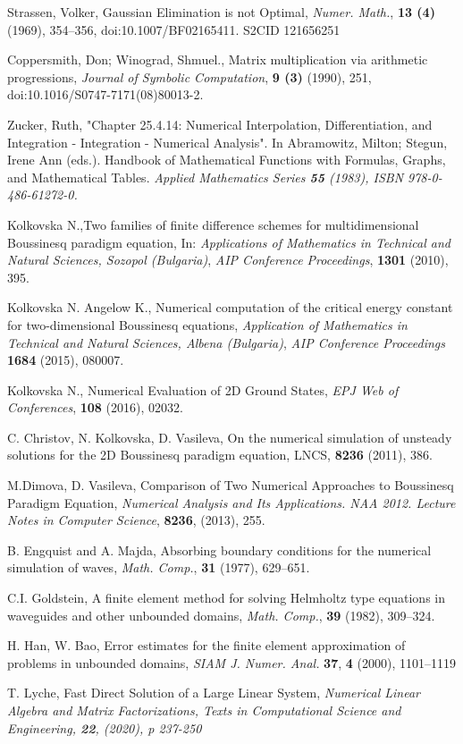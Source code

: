 \documentclass{article}
\begin{document}
\begin{thebibliography}{99}
Strassen, Volker, Gaussian Elimination is not Optimal,
{\it Numer. Math.}, \textbf{13 (4)} (1969), 354–356, doi:10.1007/BF02165411. S2CID 121656251

 Coppersmith, Don; Winograd, Shmuel., Matrix multiplication via arithmetic progressions,
{\it  Journal of Symbolic Computation}, \textbf{9 (3)} (1990), 251, doi:10.1016/S0747-7171(08)80013-2.

Zucker, Ruth, "Chapter 25.4.14: Numerical Interpolation, Differentiation, and Integration - Integration - Numerical Analysis". In Abramowitz, Milton; Stegun, Irene Ann (eds.). Handbook of Mathematical Functions with Formulas, Graphs, and Mathematical Tables. 
\it{Applied Mathematics Series} \textbf{55}  (1983), ISBN 978-0-486-61272-0.

 Kolkovska N.,Two families of finite difference schemes for multidimensional Boussinesq paradigm equation, In:
{\it Applications of Mathematics in Technical and Natural Sciences,  Sozopol (Bulgaria)},
\emph{AIP Conference Proceedings}, \textbf{1301} (2010), 395.

 Kolkovska N. Angelow K., Numerical computation of the critical energy constant for two-dimensional Boussinesq equations,
{\it Application of Mathematics in Technical and Natural Sciences, Albena (Bulgaria)},
\emph{AIP Conference Proceedings}  \textbf{1684} (2015), 080007.

 Kolkovska N., Numerical Evaluation of 2D Ground States,
\emph{ EPJ Web of Conferences}, \textbf{108} (2016), 02032.

C. Christov, N. Kolkovska, D. Vasileva, On the numerical simulation of unsteady solutions for the 2D Boussinesq paradigm equation, LNCS, \textbf{8236}  (2011), 386.

M.Dimova, D. Vasileva, Comparison of Two Numerical Approaches to Boussinesq Paradigm Equation, 
{\it Numerical Analysis and Its Applications. NAA 2012. Lecture Notes in Computer Science}, \textbf{8236}, (2013), 255.

 B. Engquist and A. Majda, Absorbing boundary conditions for the numerical simulation of waves, {\it Math. Comp.}, \textbf{31} (1977), 629–651.

  C.I. Goldstein, A finite element method for solving Helmholtz type equations in waveguides and other unbounded domains,
{\it Math. Comp.}, \textbf{39} (1982), 309–324.

  H. Han, W. Bao, Error estimates for the finite element approximation of problems in unbounded domains,
{\it SIAM J. Numer. Anal.} \textbf{37}, \textbf{4} (2000), 1101–1119

 T. Lyche, Fast Direct Solution of a Large Linear System,
\it{Numerical Linear Algebra and Matrix Factorizations, Texts in Computational Science and Engineering}, \textbf{22}, (2020), p 237-250 

\end{thebibliography}
\end{document}
